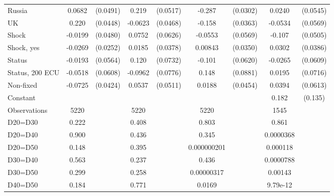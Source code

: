 \begin{tabular}{l|cccccc|cc}
Russia        &   0.0682         & (0.0491)&    0.219\sym{***}& (0.0517)&   -0.287\sym{***}& (0.0302)&   0.0240         & (0.0545)\\
UK            &    0.220\sym{***}& (0.0448)&  -0.0623         & (0.0468)&   -0.158\sym{***}& (0.0363)&  -0.0534         & (0.0569)\\
Shock         &  -0.0199         & (0.0480)&   0.0752         & (0.0626)&  -0.0553         & (0.0569)&   -0.107\sym{**} & (0.0505)\\
Shock, yes    &  -0.0269         & (0.0252)&   0.0185         & (0.0378)&  0.00843         & (0.0350)&   0.0302         & (0.0386)\\
Status        &  -0.0193         & (0.0564)&    0.120         & (0.0732)&   -0.101         & (0.0620)&  -0.0265         & (0.0609)\\
Status, 200 ECU&  -0.0518         & (0.0608)&  -0.0962         & (0.0776)&    0.148\sym{*}  & (0.0881)&   0.0195         & (0.0716)\\
Non-fixed     &  -0.0725\sym{*}  & (0.0424)&   0.0537         & (0.0511)&   0.0188         & (0.0454)&   0.0394         & (0.0613)\\
Constant        &                  &         &                  &         &                  &         &    0.182         &  (0.135)\\
\hline
Observations    &     5220         &         &     5220         &         &     5220         &         &     1545         &         \\
D20=D30         &    0.222         &         &    0.408         &         &    0.803         &         &    0.861         &         \\
D20=D40         &    0.900         &         &    0.436         &         &    0.345         &         &0.0000368         &         \\
D20=D50         &    0.148         &         &    0.395         &         &0.000000201         &         & 0.000118         &         \\
D30=D40         &    0.563         &         &    0.237         &         &    0.436         &         &0.0000788         &         \\
D30=D50         &    0.299         &         &    0.258         &         &0.00000317         &         &  0.00143         &         \\
D40=D50         &    0.184         &         &    0.771         &         &   0.0169         &         & 9.79e-12         &         \\

\end{tabular}
